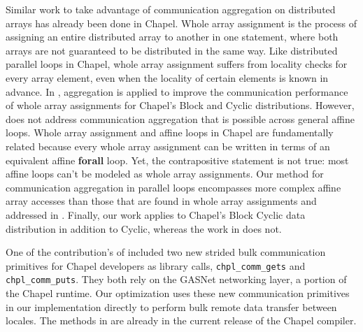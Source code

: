 Similar work to take advantage of communication aggregation on distributed arrays has already been done in Chapel. Whole array assignment is the process of assigning an entire distributed array to another in one statement, where both arrays are not guaranteed to be distributed in the same way. Like distributed parallel loops in Chapel, whole array assignment suffers from locality checks for every array element, even when the locality of certain elements is known in advance. In \cite{sanz2012global}, aggregation is applied to improve the communication performance of whole array assignments for Chapel's Block and Cyclic distributions. However, \cite{sanz2012global} does not address communication aggregation that is possible across general affine loops. Whole array assignment and affine loops in Chapel are fundamentally related because every whole array assignment can be written in terms of an equivalent affine \textbf{forall} loop. Yet, the contrapositive statement is not true: most affine loops can't be modeled as whole array assignments. Our method for communication aggregation in parallel loops encompasses more complex affine array accesses than those that are found in whole array assignments and addressed in \cite{sanz2012global}. Finally, our work applies to Chapel's Block Cyclic data distribution in addition to Cyclic, whereas the work in \cite{sanz2012global} does not.  

One of the contribution's of \cite{sanz2012global} included two new strided bulk communication primitives for Chapel developers as library calls, \texttt{chpl\_comm\_gets} and \texttt{chpl\_comm\_puts}. They both rely on the GASNet networking layer, a portion of the Chapel runtime.  Our optimization uses these new communication primitives in our implementation directly to perform bulk remote data transfer between locales. The methods in \cite{sanz2012global} are already in the current release of the Chapel compiler. 


